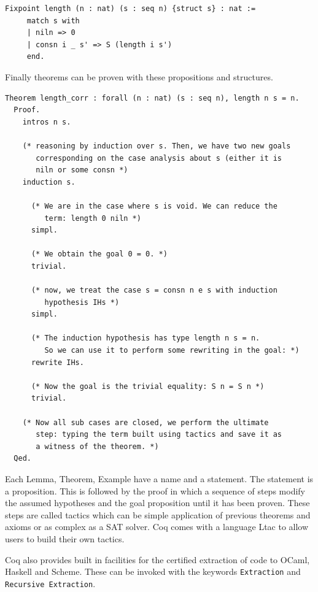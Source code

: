 \documentclass[12pt,twoside,notitlepage]{report}
\begin{document}
\begin{lstlisting}[language={Coq},caption={Coq fixpoint example}]
 Fixpoint length (n : nat) (s : seq n) {struct s} : nat := 
     match s with
     | niln => 0
     | consn i _ s' => S (length i s')
     end.
\end{lstlisting}

Finally theorems can be proven with these propositions and structures.

\begin{minipage}{\linewidth}
\begin{lstlisting}[language={Coq},caption={Coq theorem example}]
Theorem length_corr : forall (n : nat) (s : seq n), length n s = n.
  Proof.
    intros n s.

    (* reasoning by induction over s. Then, we have two new goals
       corresponding on the case analysis about s (either it is 
       niln or some consn *)
    induction s.

      (* We are in the case where s is void. We can reduce the 
         term: length 0 niln *)
      simpl. 

      (* We obtain the goal 0 = 0. *)
      trivial.

      (* now, we treat the case s = consn n e s with induction 
         hypothesis IHs *)
      simpl. 

      (* The induction hypothesis has type length n s = n. 
         So we can use it to perform some rewriting in the goal: *)
      rewrite IHs. 

      (* Now the goal is the trivial equality: S n = S n *)
      trivial.

    (* Now all sub cases are closed, we perform the ultimate
       step: typing the term built using tactics and save it as
       a witness of the theorem. *)
  Qed.	  
\end{lstlisting}
\end{minipage}
Each Lemma, Theorem, Example have a name and a statement. The statement is a proposition. This is followed by the proof in which a sequence of steps modify the assumed hypotheses and the goal proposition until it has been proven. These steps are called tactics which can be simple application of previous theorems and axioms or as complex as a SAT solver. Coq comes with a language Ltac to allow users to build their own tactics.


Coq also provides built in facilities for the certified extraction of code to OCaml, Haskell and Scheme. These can be invoked with the keywords \lstinline[language={Coq}]|Extraction| and \lstinline[language={Coq}]|Recursive Extraction|. 
\end{document}
